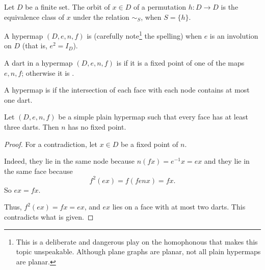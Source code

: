 \begin{lemma}[orbit]
Let $D$ be a finite set.  The orbit of $x\in D$ of a permutation $h:D\to D$
is the equivalence class of $x$ under the relation $\sim_S$, when $S=\{h\}$.
\end{lemma}

\begin{definition}[plain]
   A hypermap $(D,e,n,f)$ is
   (carefully note\footnote{This is a deliberate and
    dangerous play on the homophonous  that makes this
    topic unspeakable.  Although plane graphs are planar, not all
    plain hypermaps are planar.}  the spelling) when $e$ is an
  involution on $D$ (that is, $e^2 = I_D$).  %
\end{definition}




\begin{definition}[degenerate]
 A dart in a hypermap $(D,e,n,f)$ 
is  if it is a
fixed point of one of the maps $e,n,f$; otherwise it is .  
%
%
\end{definition}

\begin{definition}[simple] 
A hypermap is  if the intersection of each face with
each node contains at most one dart.  %
\end{definition}


\begin{lemma}\label{lemma:nondegen} 
  Let $(D,e,n,f)$ be a simple plain hypermap such that every face has
  at least three darts.  Then $n$ has no fixed point.
\end{lemma}

\begin{proof} For a contradiction, let $x\in D$ be a fixed point of
$n$. 

  Indeed, they lie in the same node
because $n(f x) = e^{-1} x = e x$ and they lie in the same face because
\[ f^2 (e x) = f (f e n x) = f x.\]  So
$e x = f x$.

Thus, $f^2 (e x) = f x = e x$, and $e x$ lies on a face with at most
two darts.  This contradicts what is given.
\end{proof}




